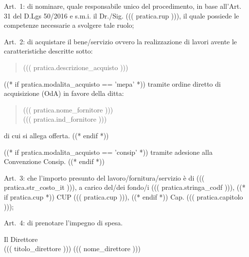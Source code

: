 \documentclass[a4paper,12pt]{letter}
\begin{document}
\begin{list}{VALUTATA}{}
\item[Art.~1:] di nominare, quale responsabile unico del procedimento, in base 
           all'Art. 31 del D.Lgs 50/2016 e s.m.i. il Dr./Sig. ((( pratica.rup ))),
           il quale possiede le competenze necessarie a svolgere tale ruolo; 
\item[Art.~2:] di acquistare il bene/servizio ovvero la realizzazione di lavori
        avente le caratteristiche descritte sotto:
\begin{quote}
            ((( pratica.descrizione_acquisto )))
\end{quote}

((* if pratica.modalita_acquisto == 'mepa' *))
tramite ordine diretto di acquisizione (OdA) in favore della ditta:
\begin{quote}
((( pratica.nome_fornitore ))) \\
((( pratica.ind_fornitore )))
\end{quote}
di cui si allega offerta.
((* endif *))

((* if pratica.modalita_acquisto == 'consip' *))
tramite adesione alla Convenzione Consip.
((* endif *))


\item[Art.~3:] che l'importo presunto del lavoro/fornitura/servizio è di 
((( pratica.str_costo_it ))),
a carico del/dei fondo/i ((( pratica.stringa_codf ))), ((* if pratica.cup *)) CUP ((( pratica.cup ))), ((* endif *)) Cap. ((( pratica.capitolo ))); 
\end{list}
\begin{minipage}{\linewidth}
\begin{list}{VALUTATA}{}
\item[Art.~4:] di prenotare l'impegno di spesa. 
\end{list}
\vspace{10mm}

\begin{flushright}
\begin{minipage}[t]{6cm}
\begin{center}
Il Direttore \\
((( titolo_direttore ))) ((( nome_direttore )))
\end{center}
\end{minipage}
\end{flushright}
\end{minipage}
\end{document}
